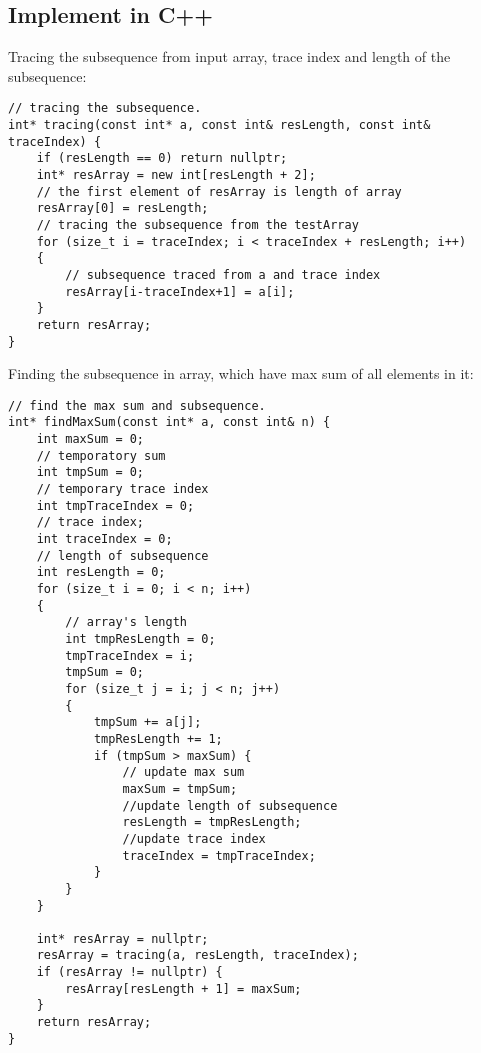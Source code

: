 \documentclass[a4paper]{article}
\begin{document}
\subsection{Implement in C++}
Tracing the subsequence from input array, trace index and length of the subsequence:
\begin{lstlisting}
// tracing the subsequence.
int* tracing(const int* a, const int& resLength, const int& traceIndex) {
    if (resLength == 0) return nullptr;
    int* resArray = new int[resLength + 2];
    // the first element of resArray is length of array
    resArray[0] = resLength;
    // tracing the subsequence from the testArray
    for (size_t i = traceIndex; i < traceIndex + resLength; i++)
    {
        // subsequence traced from a and trace index
        resArray[i-traceIndex+1] = a[i];
    }
    return resArray;
}
\end{lstlisting}
Finding the subsequence in array, which have max sum of all elements in it:
\begin{lstlisting}
// find the max sum and subsequence.
int* findMaxSum(const int* a, const int& n) {
    int maxSum = 0;
    // temporatory sum
    int tmpSum = 0;
    // temporary trace index
    int tmpTraceIndex = 0;
    // trace index;
    int traceIndex = 0;
    // length of subsequence
    int resLength = 0;
    for (size_t i = 0; i < n; i++)
    {
        // array's length
        int tmpResLength = 0;
        tmpTraceIndex = i;
        tmpSum = 0;
        for (size_t j = i; j < n; j++)
        {
            tmpSum += a[j];
            tmpResLength += 1;
            if (tmpSum > maxSum) {
                // update max sum
                maxSum = tmpSum;
                //update length of subsequence
                resLength = tmpResLength;
                //update trace index
                traceIndex = tmpTraceIndex;
            }
        }
    }
    
    int* resArray = nullptr;
    resArray = tracing(a, resLength, traceIndex);
    if (resArray != nullptr) {
        resArray[resLength + 1] = maxSum;
    }
    return resArray;
}
\end{lstlisting}
\end{document}
